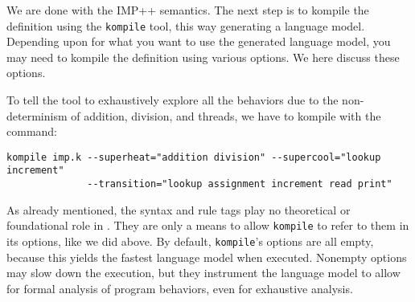 \documentclass{article}
\begin{document}
\begin{kdefinition}
\begin{kblock}[text]
We are done with the IMP++ semantics.  The next step is to kompile the
definition using the \texttt{kompile} tool, this way generating a language
model.  Depending upon for what you want to use the generated language model,
you may need to kompile the definition using various options.  We here discuss
these options.

To tell the \K tool to exhaustively explore all the behaviors due to the
non-determinism of addition, division, and threads, we have to kompile
with the command:
\begin{verbatim}
kompile imp.k --superheat="addition division" --supercool="lookup increment"
              --transition="lookup assignment increment read print"
\end{verbatim}
As already mentioned, the syntax and rule tags play no theoretical or
foundational role in \K.  They are only a means to allow \texttt{kompile} to
refer to them in its options, like we did above.  By default, \texttt{kompile}'s
options are all empty, because this yields the fastest language model when
executed.  Nonempty options may slow down the execution, but they instrument
the language model to allow for formal analysis of program behaviors, even for
exhaustive analysis.


\end{kblock}
\end{kdefinition}
\end{document}
